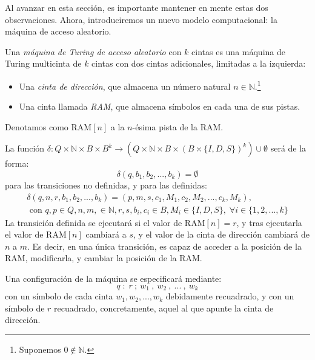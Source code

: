 Al avanzar en esta sección, es importante mantener en mente estas dos observaciones. Ahora, introduciremos un nuevo modelo computacional: la máquina de acceso aleatorio. \cite{MacCormick2018}


\begin{definicion}
Una \emph{máquina de Turing de acceso aleatorio} con $k$ cintas es una máquina de Turing multicinta de $k$ cintas con dos cintas adicionales, limitadas a la izquierda:
\begin{itemize}
    \item Una \textit{cinta de dirección}, que almacena un número natural $n\in\mathbb{N}$.\footnote{Suponemos $0\notin\mathbb{N}$.}
    \item Una cinta llamada \textit{RAM}, que almacena símbolos en cada una de sus pistas.
\end{itemize}
Denotamos como $\text{RAM}[n]$ a la $n$-ésima pista de la RAM.

La función $\delta : Q \times \mathbb{N} \times B \times B^k \longrightarrow \left(Q \times \mathbb{N} \times B \times (B \times \{I, D, S\})^k\right) \cup \emptyset$ será de la forma:
$$
\delta(q, b_1, b_2, ..., b_k) = \emptyset
$$
para las transiciones no definidas, y para las definidas:
\begin{multline}
    \delta(q, n, r, b_1, b_2, ..., b_k) = (p, m, s, c_1, M_1, c_2, M_2, ..., c_k, M_k),\\ \text{ con }q,p\in Q, n, m, \in \mathbb{N}, r, s, b_i, c_i \in B, M_i \in \{I, D, S\},\;\forall i \in \{1, 2, ..., k\}
\end{multline}
La transición definida se ejecutará si el valor de $\text{RAM}[n]=r$, y tras ejecutarla el valor de $\text{RAM}[n]$ cambiará a $s$, y el valor de la cinta de dirección cambiará de $n$ a $m$. Es decir, en una única transición, es capaz de acceder a la posición de la RAM, modificarla, y cambiar la posición de la RAM.

Una configuración de la máquina se especificará mediante:
$$q\;:\;r\:;\:w_1\:,\:w_2\:,\:...\:,\:w_k$$
con un símbolo de cada cinta $w_1, w_2, ..., w_k$ debidamente recuadrado, y con un símbolo de $r$ recuadrado, concretamente, aquel al que apunte la cinta de dirección.
\end{definicion}

